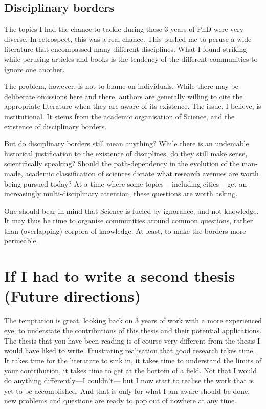 \subsection{Disciplinary borders}
\label{sub:disciplinary_borders}


The topics I had the chance to tackle during these 3 years of PhD were very
diverse. In retrospect, this was a real chance. This pushed me to peruse a wide
literature that encompassed many different disciplines. What I found striking
while perusing articles and books is the tendency of the different communities to
ignore one another. 

The problem, however, is not to blame on individuals. While there may be
deliberate omissions here and there, authors are generally willing to cite the
appropriate literature when they are aware of its existence. The issue, I
believe, is institutional. It stems from the academic organisation of Science,
and the existence of disciplinary borders.

But do disciplinary borders still mean anything? While there is an undeniable
historical justification to the existence of disciplines, do they still make
sense, scientifically speaking? Should the path-dependency in the evolution of
the man-made, academic classification of sciences dictate what research avenues
are worth being pursued today? At a time where some topics -- including cities
-- get an increasingly multi-disciplinary attention, these questions are worth
asking.

One should bear in mind that Science is fueled by ignorance, and not knowledge.
It may thus be time to organise communities around common questions, rather than
(overlapping) corpora of knowledge. At least, to make the borders more
permeable.


\section{If I had to write a second thesis (Future directions)}
\label{sec:limitations}

The temptation is great, looking back on $3$ years of work with a more
experienced eye, to understate the contributions of this thesis and their
potential applications. The thesis that you have been reading is of course very
different from the thesis I would have liked to write. Frustrating realisation
that good research takes time. It takes time for the literature to sink in, it
takes time to understand the limits of your contribution, it takes time to get
at the bottom of a field. Not that I would do anything differently---I
couldn't--- but I now start to realise the work that is yet to be accomplished.
And that is only for what I am aware should be done, new problems and questions
are ready to pop out of nowhere at any time.\\

